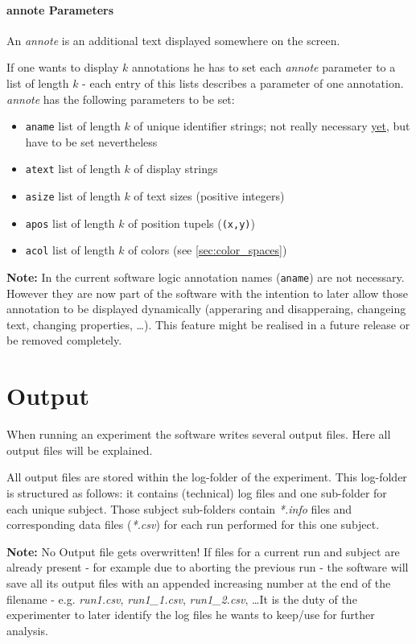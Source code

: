 \documentclass[12pt,a4paper]{book}
\begin{document}
\subsubsection{annote Parameters}

An \textit{annote} is an additional text displayed somewhere on the screen.

If one wants to display $k$ annotations he has to set each \textit{annote} parameter to a list of length $k$ - each entry of this lists describes a parameter of one annotation. \textit{annote} has the following parameters to be set:
\begin{itemize}
	\item \verb|aname| list of length $k$ of unique identifier strings; not really necessary \underline{yet}, but have to be set nevertheless 
	\item \verb|atext| list of length $k$ of display strings
	\item \verb|asize| list of length $k$ of text sizes (positive integers)
	\item \verb|apos| list of length $k$ of position tupels (\verb|(x,y)|)
	\item \verb|acol| list of length $k$ of colors (see \ref{sec:color_spaces})
\end{itemize}

\textbf{Note:} In the current software logic annotation names (\verb|aname|) are not necessary. However they are now part of the software with the intention to later allow those annotation to be displayed dynamically (apperaring and disapperaing, changeing text, changing properties, \dots). This feature might be realised in a future release or be removed completely.

\chapter{Output}

When running an experiment the software writes several output files. Here all output files will be explained.

All output files are stored within the log-folder of the experiment. This log-folder is structured as follows: it contains (technical) log files and one sub-folder for each unique subject. Those subject sub-folders contain \textit{*.info} files and corresponding data files (\textit{*.csv}) for each run performed for this one subject.

\textbf{Note:} No Output file gets overwritten! If files for a current run and subject are already present - for example due to aborting the previous run - the software will save all its output files with an appended increasing number at the end of the filename - e.g. \textit{run1.csv}, \textit{run1\_1.csv}, \textit{run1\_2.csv}, \dots It is the duty of the experimenter to later identify the log files he wants to keep/use for further analysis.
\end{document}

